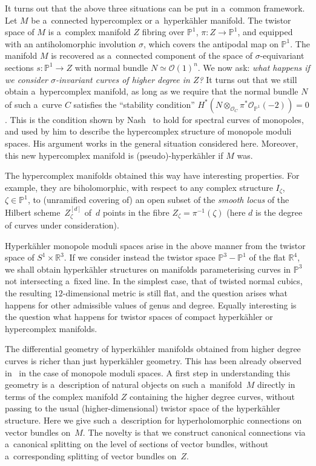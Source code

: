 \documentclass[pdftex]{sigma}
\numberwithin{equation}{section}
\begin{document}
It turns out that the above three situations can be put in a~common framework.
Let $M$ be a~connected hypercomplex or a~hyperk\"ahler manifold.
The twistor space of $M$ is a~complex manifold $Z$ f\/ibring over ${\mathbb{P}}^1$, $\pi:Z\to {\mathbb{P}}^1$, and
equipped with an antiholomorphic involution $\sigma$, which covers the antipodal map on ${\mathbb{P}}^1$.
The manifold $M$ is recovered as a~connected component of the space of $\sigma$-equivariant sections
$s:{\mathbb{P}}^1\to Z$ with normal bundle $N\simeq {\mathcal{O}}(1)^n$.
We now ask: {\em what happens if we consider $\sigma$-invariant curves of higher degree in $Z$?} It turns out that we
still obtain a~hypercomplex manifold, as long as we require that the normal bundle $N$ of such a~curve $C$ satisf\/ies the
``stability condition'' $H^\ast(N\otimes_{{\mathcal{O}}_C}\pi^\ast{\mathcal{O}}_{{\mathbb{P}}^1}(-2))=0$.
This is the condition shown by Nash~\cite{Nash} to hold for spectral curves of monopoles, and used by him to describe
the hypercomplex structure of monopole moduli spaces.
His argument works in the general situation considered here.
Moreover, this new hypercomplex manifold is (pseudo)-hyperk\"ahler if $M$ was.

The hypercomplex manifolds obtained this way have interesting properties.
For example, they are biholomorphic, with respect to any complex structure $I_\zeta$, $\zeta\in {\mathbb{P}}^1$, to
(unramif\/ied covering of) an open subset of the {\em smooth locus} of the Hilbert scheme~$Z_\zeta^{[d]}$ of~$d$ points in
the f\/ibre $Z_\zeta=\pi^{-1}(\zeta)$ (here $d$ is the degree of curves under consideration).

Hyperk\"ahler monopole moduli spaces arise in the above manner from the twistor space of $S^1\times {\mathbb{R}}^3$.
If we consider instead the twistor space ${\mathbb{P}}^3-{\mathbb{P}}^1$ of the f\/lat ${\mathbb{R}}^4$, we shall obtain
hyperk\"ahler structures on manifolds parameterising curves in ${\mathbb{P}}^3$ not intersecting a~f\/ixed line.
In the simplest case, that of twisted normal cubics, the resulting $12$-dimensional metric is still f\/lat, and the
question arises what happens for other admissible values of genus and degree.
Equally interesting is the question what happens for twistor spaces of compact hyperk\"ahler or hypercomplex manifolds.

The dif\/ferential geometry of hyperk\"ahler manifolds obtained from higher degree curves is richer than just
hyperk\"ahler geometry.
This has been already observed in~\cite{BS2} in the case of monopole moduli spaces.
A f\/irst step in understanding this geometry is a~description of natural objects on such a~manifold~$M$ directly in terms
of the complex manifold $Z$ containing the higher degree curves, without passing to the usual (higher-dimensional)
twistor space of the hyperk\"ahler structure.
Here we give such a~description for hyperholomorphic connections on vector bundles on~$M$.
The novelty is that we construct canonical connections via a~canonical splitting on the level of sections of vector
bundles, without a~corresponding splitting of vector bundles on~$Z$.
\end{document}
